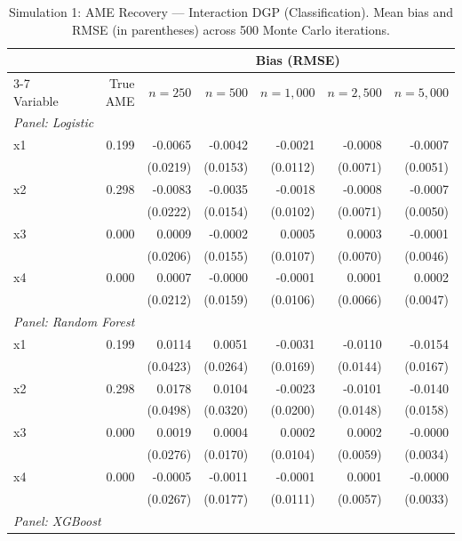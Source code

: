 \begin{table}[htbp]
\centering
\small
\begin{threeparttable}
\caption{Simulation 1: AME Recovery --- Interaction DGP (Classification). Mean bias and RMSE (in parentheses) across 500 Monte Carlo iterations.}
\label{tab:sim1_classification_interaction}
\begin{tabular}{lrrrrrr}
\toprule
 & & \multicolumn{5}{c}{Bias (RMSE)} \\
\cmidrule(lr){3-7}
Variable & True AME & $n=250$ & $n=500$ & $n=1,000$ & $n=2,500$ & $n=5,000$ \\
\midrule
\multicolumn{7}{l}{\textit{Panel: Logistic}} \\
\quad x1 & 0.199 & -0.0065 & -0.0042 & -0.0021 & -0.0008 & -0.0007 \\
 &  & (0.0219) & (0.0153) & (0.0112) & (0.0071) & (0.0051) \\
\quad x2 & 0.298 & -0.0083 & -0.0035 & -0.0018 & -0.0008 & -0.0007 \\
 &  & (0.0222) & (0.0154) & (0.0102) & (0.0071) & (0.0050) \\
\quad x3 & 0.000 & 0.0009 & -0.0002 & 0.0005 & 0.0003 & -0.0001 \\
 &  & (0.0206) & (0.0155) & (0.0107) & (0.0070) & (0.0046) \\
\quad x4 & 0.000 & 0.0007 & -0.0000 & -0.0001 & 0.0001 & 0.0002 \\
 &  & (0.0212) & (0.0159) & (0.0106) & (0.0066) & (0.0047) \\
\midrule
\multicolumn{7}{l}{\textit{Panel: Random Forest}} \\
\quad x1 & 0.199 & 0.0114 & 0.0051 & -0.0031 & -0.0110 & -0.0154 \\
 &  & (0.0423) & (0.0264) & (0.0169) & (0.0144) & (0.0167) \\
\quad x2 & 0.298 & 0.0178 & 0.0104 & -0.0023 & -0.0101 & -0.0140 \\
 &  & (0.0498) & (0.0320) & (0.0200) & (0.0148) & (0.0158) \\
\quad x3 & 0.000 & 0.0019 & 0.0004 & 0.0002 & 0.0002 & -0.0000 \\
 &  & (0.0276) & (0.0170) & (0.0104) & (0.0059) & (0.0034) \\
\quad x4 & 0.000 & -0.0005 & -0.0011 & -0.0001 & 0.0001 & -0.0000 \\
 &  & (0.0267) & (0.0177) & (0.0111) & (0.0057) & (0.0033) \\
\midrule
\multicolumn{7}{l}{\textit{Panel: XGBoost}} \\

\end{tabular}
\end{threeparttable}
\end{table}
